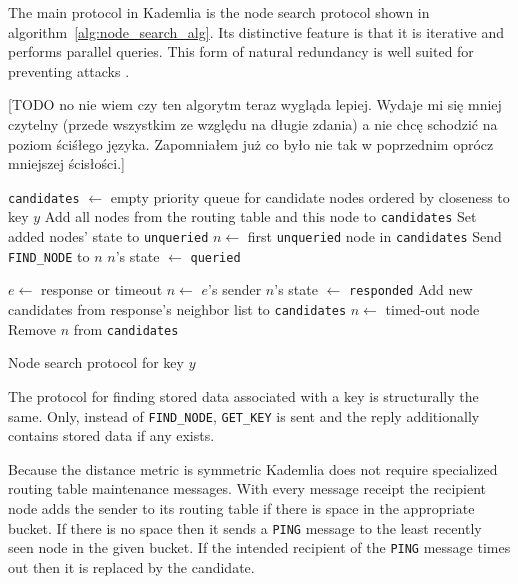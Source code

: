   The main protocol in Kademlia is the node search protocol shown in
  algorithm~\ref{alg:node_search_alg}. Its distinctive feature is that it is
  iterative and performs parallel queries. This form of natural redundancy is
  well suited for preventing attacks \cite{sit02}.

  [TODO no nie wiem czy ten algorytm teraz wygląda lepiej. Wydaje mi się mniej
    czytelny (przede wszystkim ze względu na długie zdania) a nie chcę schodzić
    na poziom ściśłego języka. Zapomniałem już co było nie tak w poprzednim
  opr{\'o}cz mniejszej ścisłości.]

  \begin{algorithm}
    \begin{algorithmic}[1]
    \STATE \texttt{candidates} $\leftarrow$ empty priority queue for candidate
    nodes ordered by closeness to key $y$
    \STATE Add all nodes from the routing table and this node to
    \texttt{candidates}
    \STATE Set added nodes' state to \texttt{unqueried}
        \STATE $n \leftarrow$ first \texttt{unqueried} node in
          \texttt{candidates} 
        \STATE Send \texttt{FIND\_NODE} to $n$
        \STATE $n$'s state $\leftarrow$ \texttt{queried}
    \ENDWHILE
      
    \STATE $e \leftarrow$ response or timeout
      \STATE $n \leftarrow$ $e$'s sender
      \STATE $n$'s state $\leftarrow$ \texttt{responded}
      \STATE Add new candidates from response's neighbor list to
      \texttt{candidates}
    \ELSE
      \STATE $n \leftarrow$ timed-out node
      \STATE Remove $n$ from \texttt{candidates}
    \ENDIF
    \ENDWHILE
  \end{algorithmic}
    \caption{Node search protocol for key $y$}
    \label{alg:node_search_alg}
  \end{algorithm}

  The protocol for finding stored data associated with a key is structurally the
  same. Only, instead of \texttt{FIND\_NODE}, \texttt{GET\_KEY} is sent and the
  reply additionally contains stored data if any exists.

  Because the distance metric is symmetric Kademlia does not require specialized
  routing table maintenance messages. With every message receipt the recipient
  node adds the sender to its routing table if there is space in the appropriate
  bucket. If there is no space then it sends a \texttt{PING} message to the
  least recently seen node in the given bucket. If the intended recipient of the
  \texttt{PING} message times out then it is replaced by the candidate.

